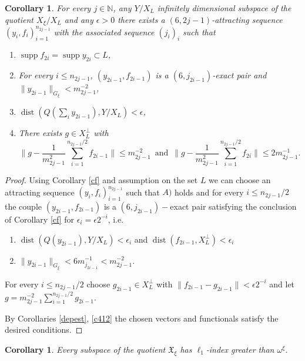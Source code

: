 \documentclass[a4paper]{amsart}
\theoremstyle{plain}
\newtheorem{corollary}[theorem]{Corollary}
\newcommand{\N}{\mathbb{N}}
\newcommand{\e}{\epsilon}
\newcommand{\norm}[1][\cdot]{\lVert #1\rVert}
\DeclareMathOperator{\supp}{supp}
\DeclareMathOperator{\dist}{dist}
\begin{document}
\begin{corollary}\label{c5.3}
For every  $j\in\N$, any $Y/X_L$ infinitely dimensional subspace of the quotient
$X_\xi/X_L$ and any $\e>0$ there exists a $(6,2j-1)$-attracting sequence
$(y_{i},f_{i})_{i=1}^{n_{2j-1}}$ with the associated sequence $(j_{i})_{i}$ such that
\begin{enumerate}
\item[A)]  $\supp f_{2i}=\supp y_{2i}\subset L$,
\item[B)] For every $i\leq n_{2j-1}$, $(y_{2i-1},f_{2i-1})$ is a
$(6,j_{2i-1})$-exact pair and
$\norm[y_{2i-1}]_{G_{\xi}}<m_{2j-1}^{-2}$,
\item[C)] $\dist (Q(\sum_iy_{2i-1}),Y/X_L)<\e$,
\item[D)] There exists  $g\in X_{L}^{\perp} $ with
$$
\|g-\frac{1}{m_{2j-1}^{2}}\sum_{i=1}^{n_{2j-1}/2}f_{2i-1}\|\leq
m_{2j-1}^{-2}\,\,\,\textrm{and}\,\,\,
\|g-\frac{1}{m_{2j-1}^{2}}\sum_{i=1}^{n_{2j-1}/2}f_{2i}\|\leq
2m_{2j-1}^{-1}.
$$
\end{enumerate}
\end{corollary}
\begin{proof}
Using Corollary \ref{cf} and assumption on the set $L$ we can
choose an attracting sequence $(y_{i},f_{i})_{i=1}^{n_{2j-1}}$
such that $A)$ holds and for every $i\leq n_{2j-1}/2$ the couple
$(y_{2i-1},f_{2i-1})$ is a $(6,j_{2i-1})-$exact pair satisfying the conclusion of Corollary
\ref{cf} for $\e_i=\e2^{-i}$, i.e.
\begin{enumerate}
 \item $\dist(Q(y_{2i-1}),Y/X_L)<\e_i$ and $\dist(f_{2i-1}, X_{L}^{\perp})<\e_i$
\item $\norm[y_{2i-1}]_{G_{\xi}}<6m_{j_{2i-1}}^{-1}<m_{2j-1}^{-2}$.
\end{enumerate}
For every $i\leq n_{2j-1}/2$ choose $g_{2i-1}\in
X_{L}^{\perp}$ with $\norm[f_{2i-1}-g_{2i-1}]<\e2^{-i}$ and let
$g=m_{2j-1}^{-2}\sum_{i=1}^{n_{2j-1}/2}g_{2i-1}$.

By Corollaries  \ref{depest}, \ref{c412} the chosen vectors and functionals satisfy the desired conditions.
\end{proof}
\begin{corollary}\label{last} Every subspace of the quotient $\mathfrak{X}_\xi$ has   $\ell_{1}$-index greater than $\omega^{\xi}$.
 \end{corollary}
\end{document}
